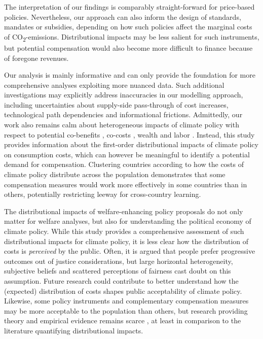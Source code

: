 \documentclass[12pt, a4paper]{article}
\begin{document}
The interpretation of our findings is comparably straight-forward for price-based policies. Nevertheless, our approach can also inform the design of standards, mandates or subsidies, depending on how such policies affect the marginal costs of CO\textsubscript{2}-emissions. Distributional impacts may be less salient for such instruments, but potential compensation would also become more difficult to finance because of foregone revenues. %

Our analysis is mainly informative and can only provide the foundation for more comprehensive analyses exploiting more nuanced data. Such additional investigations may explicitly address inaccuracies in our modelling approach, including uncertainties about supply-side pass-through of cost increases, technological path dependencies and informational frictions. Admittedly, our work also remains calm about heterogeneous impacts of climate policy with respect to potential co-benefits \autocite[e.g.][]{Holland.2019,Karlsson.2020}, co-costs \autocite[e.g.][]{Fuje.2019,Greve.2022}, wealth \autocite[e.g.][]{Fullerton.2011} and labor \autocite[e.g.][]{Castellanos.2024}. Instead, this study provides information about the first-order distributional impacts of climate policy on consumption costs, which can however be meaningful to identify a potential demand for compensation. Clustering countries according to how the costs of climate policy distribute across the population demonstrates that some compensation measures would work more effectively in some countries than in others, potentially restricting leeway for cross-country learning. %

The distributional impacts of welfare-enhancing policy proposals do not only matter for welfare analyses, but also for understanding the political economy of climate policy. While this study provides a comprehensive assessment of such distributional impacts for climate policy, it is less clear how the distribution of costs is \textit{perceived} by the public. Often, it is argued that people prefer progressive outcomes out of justice considerations, but large horizontal heterogeneity, subjective beliefs \autocite{Douenne.2020} and scattered perceptions of fairness \autocite{MaestreAndres.2019,Povitkina.2021} cast doubt on this assumption. Future research could contribute to better understand how the (expected) distribution of costs shapes public acceptability of climate policy. Likewise, some policy instruments and complementary compensation measures may be more acceptable to the population than others, but research providing theory and empirical evidence remains scarce \autocite[e.g.][]{Sommer.2022,Valencia.2023}, at least in comparison to the literature quantifying distributional impacts. 
\end{document}
